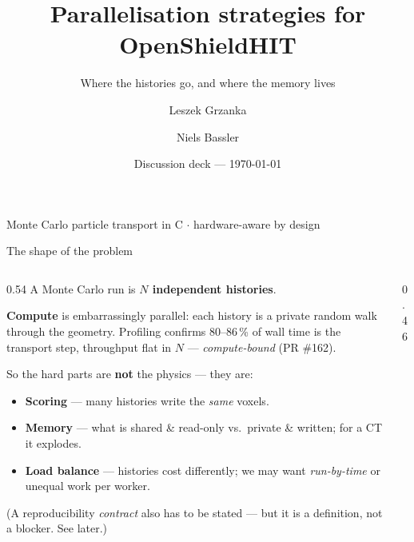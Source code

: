 \documentclass[aspectratio=169,10pt]{beamer}
\title{Parallelisation strategies for OpenShieldHIT}
\subtitle{Where the histories go, and where the memory lives}
\author{Leszek Grzanka \and Niels Bassler}
\date{Discussion deck — \today}
\begin{document}
\begin{frame}[plain]
  \titlepage
  \begin{center}\scriptsize\color{oshGrey}
    Monte Carlo particle transport in C \;$\cdot$\; hardware-aware by design
  \end{center}
\end{frame}

\begin{frame}{The shape of the problem}
  \begin{columns}[T]
    \begin{column}{0.54\textwidth}
      \small
      A Monte Carlo run is \textbf{$N$ independent histories}.
      \medskip

      \textbf{Compute} is embarrassingly parallel: each history is a private
      random walk through the geometry. Profiling confirms 80--86\,\% of wall
      time is the transport step, throughput flat in $N$ — \emph{compute-bound}
      (PR \#162).

      \medskip
      So the hard parts are \textbf{not} the physics — they are:
      \begin{itemize}
        \item \textbf{Scoring} — many histories write the \emph{same} voxels.
        \item \textbf{Memory} — what is \textcolor{oshGreen}{shared \& read-only}
              vs.\ \textcolor{oshAmber}{private \& written}; for a CT it explodes.
        \item \textbf{Load balance} — histories cost differently; we may want
              \emph{run-by-time} or unequal work per worker.
      \end{itemize}
      \footnotesize\color{oshGrey}(A reproducibility \emph{contract} also has to
      be stated — but it is a definition, not a blocker. See later.)
    \end{column}
    \begin{column}{0.46\textwidth}
      \centering
    \end{column}
  \end{columns}
\end{frame}
\end{document}
